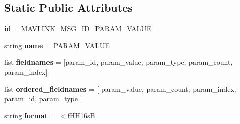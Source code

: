 \subsection*{Static Public Attributes}
\begin{DoxyCompactItemize}
\item 
\mbox{\label{classpymavlink_1_1dialects_1_1v10_1_1MAVLink__param__value__message_a42300bcc0d52e5c5b91c40fbc4eb2ddf}} 
{\bfseries id} = M\+A\+V\+L\+I\+N\+K\+\_\+\+M\+S\+G\+\_\+\+I\+D\+\_\+\+P\+A\+R\+A\+M\+\_\+\+V\+A\+L\+UE
\item 
\mbox{\label{classpymavlink_1_1dialects_1_1v10_1_1MAVLink__param__value__message_ab9bad5c0a02bb23945671482114a1b53}} 
string {\bfseries name} = \textquotesingle{}P\+A\+R\+A\+M\+\_\+\+V\+A\+L\+UE\textquotesingle{}
\item 
\mbox{\label{classpymavlink_1_1dialects_1_1v10_1_1MAVLink__param__value__message_a79ba6825f6cbc5ae0217161be083e1e2}} 
list {\bfseries fieldnames} = \mbox{[}\textquotesingle{}param\+\_\+id\textquotesingle{}, \textquotesingle{}param\+\_\+value\textquotesingle{}, \textquotesingle{}param\+\_\+type\textquotesingle{}, \textquotesingle{}param\+\_\+count\textquotesingle{}, \textquotesingle{}param\+\_\+index\textquotesingle{}\mbox{]}
\item 
\mbox{\label{classpymavlink_1_1dialects_1_1v10_1_1MAVLink__param__value__message_aa1a1f51dd796f2d38fbc818072ae734b}} 
list {\bfseries ordered\+\_\+fieldnames} = \mbox{[} \textquotesingle{}param\+\_\+value\textquotesingle{}, \textquotesingle{}param\+\_\+count\textquotesingle{}, \textquotesingle{}param\+\_\+index\textquotesingle{}, \textquotesingle{}param\+\_\+id\textquotesingle{}, \textquotesingle{}param\+\_\+type\textquotesingle{} \mbox{]}
\item 
\mbox{\label{classpymavlink_1_1dialects_1_1v10_1_1MAVLink__param__value__message_a907fef83f389687f0a5e6544d7161c1c}} 
string {\bfseries format} = \textquotesingle{}$<$f\+H\+H16sB\textquotesingle{}
\item 

\end{DoxyCompactItemize}
